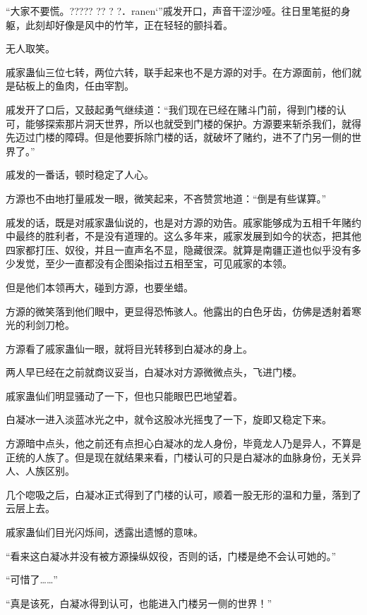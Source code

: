 
\begin{this_body}

“大家不要慌。????? ?? ? ?．ranen`”戚发开口，声音干涩沙哑。往日里笔挺的身躯，此刻却好像是风中的竹竿，正在轻轻的颤抖着。

无人取笑。

戚家蛊仙三位七转，两位六转，联手起来也不是方源的对手。在方源面前，他们就是砧板上的鱼肉，任由宰割。

戚发开了口后，又鼓起勇气继续道：“我们现在已经在赌斗门前，得到门楼的认可，能够探索那片洞天世界，所以也就受到门楼的保护。方源要来斩杀我们，就得先迈过门楼的障碍。但是他要拆除门楼的话，就破坏了赌约，进不了门另一侧的世界了。”

戚发的一番话，顿时稳定了人心。

方源也不由地打量戚发一眼，微笑起来，不吝赞赏地道：“倒是有些谋算。”

戚发的话，既是对戚家蛊仙说的，也是对方源的劝告。戚家能够成为五相千年赌约中最终的胜利者，不是没有道理的。这么多年来，戚家发展到如今的状态，把其他四家都打压、奴役，并且一直声名不显，隐藏很深。就算是南疆正道也似乎没有多少发觉，至少一直都没有企图染指过五相至宝，可见戚家的本领。

但是他们本领再大，碰到方源，也要坐蜡。

方源的微笑落到他们眼中，更显得恐怖骇人。他露出的白色牙齿，仿佛是透射着寒光的利剑刀枪。

方源看了戚家蛊仙一眼，就将目光转移到白凝冰的身上。

两人早已经在之前就商议妥当，白凝冰对方源微微点头，飞进门楼。

戚家蛊仙们明显骚动了一下，但也只能眼巴巴地望着。

白凝冰一进入淡蓝冰光之中，就令这股冰光摇曳了一下，旋即又稳定下来。

方源暗中点头，他之前还有点担心白凝冰的龙人身份，毕竟龙人乃是异人，不算是正统的人族了。但是现在就结果来看，门楼认可的只是白凝冰的血脉身份，无关异人、人族区别。

几个唿吸之后，白凝冰正式得到了门楼的认可，顺着一股无形的温和力量，落到了云层上去。

戚家蛊仙们目光闪烁间，透露出遗憾的意味。

“看来这白凝冰并没有被方源操纵奴役，否则的话，门楼是绝不会认可她的。”

“可惜了……”

“真是该死，白凝冰得到认可，也能进入门楼另一侧的世界！”


\end{this_body}
